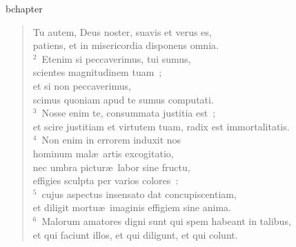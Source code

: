 bchapter\begin{flushleft}\begin{verse}\vspace{-19pt}\hspace{6pt}Tu autem, Deus noster, suavis et verus es,\\\hspace{6pt} patiens, et in misericordia disponens omnia.\\
${}^{2}$~Etenim si peccaverimus, tui sumus,\\ scientes magnitudinem tuam~;\\ et si non peccaverimus,\\ scimus quoniam apud te sumus computati.\\
${}^{3}$~Nosse enim te, consummata justitia est~;\\ et scire justitiam et virtutem tuam, radix est immortalitatis.\\
${}^{4}$~Non enim in errorem induxit nos\\ hominum mal\ae\ artis excogitatio,\\ nec umbra pictur\ae\ labor sine fructu,\\ effigies sculpta per varios colores~:\\
${}^{5}$~cujus aspectus insensato dat concupiscentiam,\\ et diligit mortu\ae\ imaginis effigiem sine anima.\\
${}^{6}$~Malorum amatores digni sunt qui spem habeant in talibus,\\ et qui faciunt illos, et qui diligunt, et qui colunt.\end{verse}\end{flushleft}


